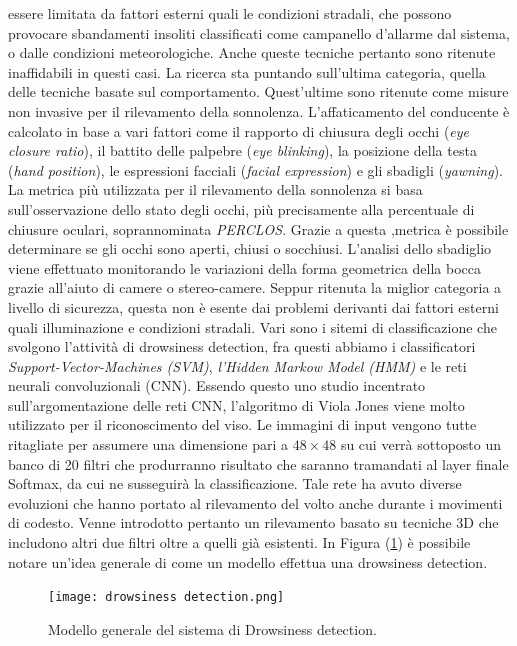 essere limitata da fattori esterni quali le condizioni stradali, che possono 
provocare sbandamenti insoliti classificati come campanello d'allarme dal 
sistema, o dalle condizioni meteorologiche. Anche queste tecniche pertanto 
sono ritenute inaffidabili in questi casi. La ricerca sta puntando sull'ultima 
categoria, quella delle tecniche basate sul comportamento. Quest'ultime 
sono ritenute come misure non invasive per il rilevamento della sonnolenza. 
L'affaticamento del conducente è calcolato in base a vari fattori come il 
rapporto di chiusura degli occhi (\emph{eye closure ratio}), il battito delle palpebre 
(\emph{eye blinking}), la posizione della testa (\emph{hand position}), le espressioni facciali 
(\emph{facial expression}) e gli sbadigli (\emph{yawning}). La metrica più utilizzata per 
il rilevamento della sonnolenza si basa sull'osservazione dello stato degli 
occhi, più precisamente alla percentuale di chiusure oculari, soprannominata 
\emph{PERCLOS}. Grazie a questa ,metrica è possibile determinare se gli occhi 
sono aperti, chiusi o socchiusi. L'analisi dello sbadiglio viene effettuato 
monitorando le variazioni della forma geometrica della bocca grazie all'aiuto 
di camere o stereo-camere. Seppur ritenuta la miglior categoria a livello 
di sicurezza, questa non è esente dai problemi derivanti dai fattori esterni 
quali illuminazione e condizioni stradali. Vari sono i sitemi di classificazione 
che svolgono l'attività di drowsiness detection, fra questi abbiamo i classificatori 
\emph{Support-Vector-Machines (SVM)}, \emph{l'Hidden Markow Model (HMM)} 
e le reti neurali convoluzionali (CNN). Essendo questo uno studio incentrato 
sull'argomentazione delle reti CNN, l'algoritmo di Viola Jones \cite{viola2001rapid} 
viene molto utilizzato per il riconoscimento del viso. Le immagini di input 
vengono tutte ritagliate per assumere una dimensione pari a $48\times 48$ su 
cui verrà sottoposto un banco di 20 filtri che produrranno risultato che saranno 
tramandati al layer finale Softmax, da cui ne susseguirà la classificazione. 
Tale rete ha avuto diverse evoluzioni che hanno portato al rilevamento del 
volto anche durante i movimenti di codesto. Venne introdotto pertanto un 
rilevamento basato su tecniche 3D che includono altri due filtri oltre a quelli 
già esistenti. In Figura (\ref{drow-det}) è possibile notare un'idea generale di come un 
modello effettua una drowsiness detection.
\begin{figure}
    \centering
    \texttt{[image: drowsiness detection.png]}
    \centering
    \caption{Modello generale del sistema di Drowsiness detection.}
    \label{drow-det}
\end{figure}

